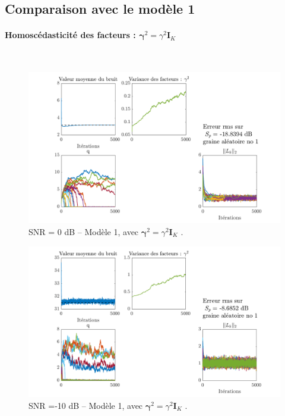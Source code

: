 \documentclass[ 12pt]{article}
\begin{document}
\newpage
\subsection{Comparaison avec le modèle 1}
\paragraph{Homoscédasticité des facteurs : $\bm{\gamma}^2 = \gamma^2\bm{I}_K$} ~\\
\begin{figure}[h!]
	\centering
	\includegraphics[width=\textwidth]{ToyCase/modele1.png}	
	\caption{SNR = 0 dB  -- Modèle 1, avec $\bm{\gamma}^2 = \gamma^2\bm{I}_K$ .}
\end{figure}
\begin{figure}[h!]
	\centering
	\includegraphics[width=\textwidth]{ToyCase/modele1_snrm10db.png}	
	\caption{SNR =-10 dB  -- Modèle 1, avec $\bm{\gamma}^2 = \gamma^2\bm{I}_K$ .}
\end{figure}

\newpage
\end{document}
